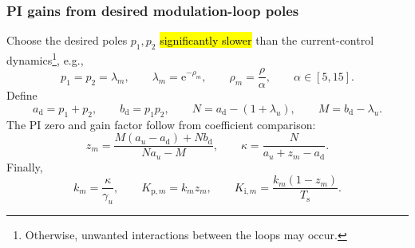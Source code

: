 
\begin{frame}
    \frametitle{PI gains from desired modulation-loop poles}
    Choose the desired poles $p_1,p_2$ \hl{significantly slower} than the current-control dynamics\footnote{Otherwise, unwanted interactions between the loops may occur.}, e.g.,
    \begin{equation}
        p_1=p_2=\lambda_m,
        \qquad
        \lambda_m=\mathrm{e}^{-\rho_m},
        \qquad
        \rho_m=\frac{\rho}{\alpha},
        \qquad
        \alpha\in[5,15] .
    \end{equation}
    Define
    \begin{equation}
        a_{\mathrm{d}}=p_1+p_2,
        \qquad
        b_{\mathrm{d}}=p_1p_2,
        \qquad
        N=a_{\mathrm{d}}-(1+\lambda_u),
        \qquad
        M=b_{\mathrm{d}}-\lambda_u .
    \end{equation}
    The PI zero and gain factor follow from coefficient comparison:
    \begin{equation}
        z_m=
        \frac{M(a_u-a_{\mathrm{d}})+Nb_{\mathrm{d}}}{Na_u-M},
        \qquad
        \kappa=
        \frac{N}{a_u+z_m-a_{\mathrm{d}}}.
    \end{equation}
    Finally,
    \begin{equation}
        k_m=\frac{\kappa}{\gamma_u},
        \qquad
        K_{\mathrm{p},m}=k_mz_m,
        \qquad
        K_{\mathrm{i},m}=
        \frac{k_m(1-z_m)}{T_{\mathrm{s}}}.
    \end{equation}
\end{frame}


